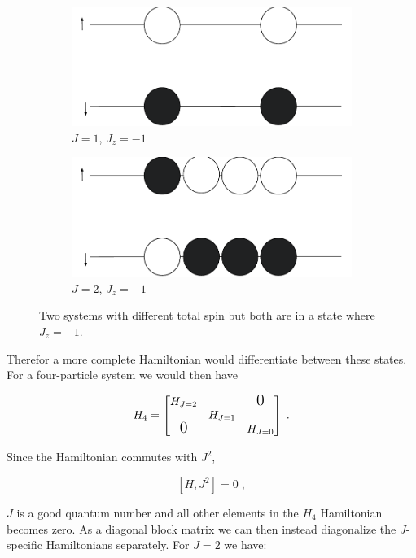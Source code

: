 \begin{figure}[H]
\centering
\begin{subfigure}{.5\textwidth}
  \centering
  \includegraphics[width=.6\textwidth]{Figures/Drawn/Lipkin/j=1.pdf}
  \caption{$J=1$, $J_z = -1$}
  \label{fig:J=1}
\end{subfigure}%
\begin{subfigure}{.5\textwidth}
  \centering
  \includegraphics[width=.6\textwidth]{Figures/Drawn/Lipkin/j=2.pdf}
  \caption{$J=2$, $J_z=-1$}
  \label{fig:J=2}
\end{subfigure}
\caption{Two systems with different total spin but both are in a state where $J_z=-1$.}
\end{figure}

Therefor a more complete Hamiltonian would differentiate between these states. For a four-particle system we would then have 

\begin{equation}
    H_{4} = \begin{bmatrix}
        H_{J=2} &  & \text{\Large0}\\
         & H_{J=1} & \\
        \text{\Large0} & & H_{J=0}
    \end{bmatrix} \; . 
\end{equation}

Since the Hamiltonian commutes with $J^2$,

\begin{equation}
    \left [ H, J^2\right ] = 0 \;,
\end{equation}

$J$ is a good quantum number and all other elements in the $H_4$ Hamiltonian becomes zero. As a diagonal block matrix we can then instead diagonalize the $J$-specific Hamiltonians separately. For $J=2$ we have:

